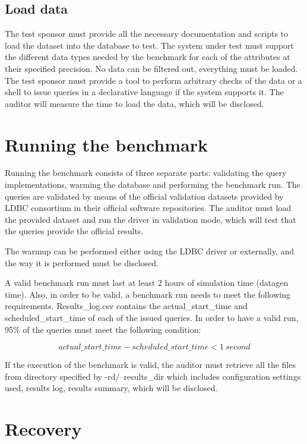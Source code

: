 \subsection{Load data}

The test sponsor must provide all the necessary documentation and scripts
to load the dataset into the database to test. The system under test must
support the different data types needed by the benchmark for each of the
attributes at their specified precision. No data can be filtered out, everything
must be loaded.  The test sponsor must provide a tool to perform arbitrary
checks of the data or a shell to issue queries in a declarative language if the
system supports it. The auditor will measure the time to load the data, which
will be disclosed.

\section{Running the benchmark}

Running the benchmark consists of three separate parts: validating the query
implementations, warming the database and performing the benchmark run. The
queries are validated by means of the official validation datasets provided by
LDBC consortium in their official software repositories. The auditor must load
the provided dataset and run the driver in validation mode, which will test
that the queries provide the official results.

The warmup can be performed either using the LDBC driver or externally, and the
way it is performed must be disclosed.

A valid benchmark run must last at least 2 hours of simulation time (datagen
time).  Also, in order to be valid, a benchmark run needs to meet the following
requirements.  Results\_log.csv contains the actual\_start\_time and
scheduled\_start\_time of each of the issued queries.  In order to have a valid
run, 95\% of the queries must meet the following condition: 

\begin{equation*}
actual\_start\_time - scheduled\_start\_time < 1 \ second
\end{equation*}

If the execution of the benchmark is valid, the auditor must retrieve all the
files from directory specified by -rd/--results\_dir which includes
configuration settings used, results log, results summary, which will be
disclosed.

\section{Recovery}

